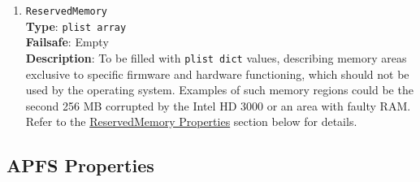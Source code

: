 \documentclass[]{article}
\begin{document}
\begin{enumerate}
\item
  \texttt{ReservedMemory}\\
  \textbf{Type}: \texttt{plist\ array}\\
  \textbf{Failsafe}: Empty\\
  \textbf{Description}: To be filled with \texttt{plist\ dict} values,
  describing memory areas exclusive to specific firmware and hardware functioning,
  which should not be used by the operating system. Examples of such memory regions
  could be the second 256 MB corrupted by the Intel HD 3000 or an area with faulty RAM.
  Refer to the \hyperref[uefirsvdprops]{ReservedMemory Properties} section below for details.

\end{enumerate}

\subsection{APFS Properties}\label{uefiapfsprops}
\end{document}
